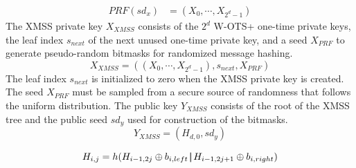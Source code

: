 \begin{align}
\label{eq:prf}
PRF(sd_x) &= (X_0, \cdots, X_{2^d-1})
\end{align}
The XMSS private key $X_{XMSS}$ consists of the $2^d$ W-OTS+ one-time private keys, the leaf index $s_{next}$ of the next unused one-time private key, and a seed $X_{PRF}$ to generate pseudo-random bitmasks for randomized message hashing.
\begin{equation}
\label{eq:priv_key}
X_{XMSS} = ((X_0, \cdots, X_{2^d-1}), s_{next}, X_{PRF})
\end{equation}
The leaf index $s_{next}$ is initialized to zero when the XMSS private key is created. The seed $X_{PRF}$ must be sampled from a secure source of randomness that follows the uniform distribution.  
The public key $Y_{XMSS}$ consists of the root of the XMSS tree and the public seed $sd_y$ used for construction of the bitmasks.
\begin{equation}
\label{eq:xmss_pubkey}
Y_{XMSS} = (H_{d,0}, sd_y)
\end{equation}



\begin{equation}
\label{eq:xmss_bitmasks}
H_{i,j} =  h(H_{i-1,2j} \oplus b_{i,left} \operatorname{|\!\!|} H_{i-1,2j+1} \oplus b_{i,right})
\end{equation}

